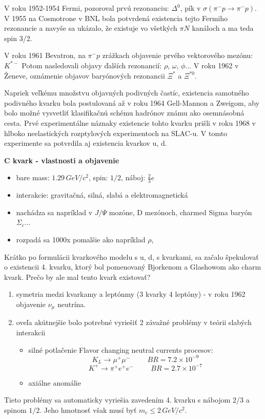 \documentclass[../../main.tex]{subfiles}
\begin{document}
V roku 1952-1954 Fermi, pozoroval prvú rezonanciu: $\Delta^0$, pík v $\sigma(\pi^{-}p \rightarrow \pi^{-}p)$. V 1955 na Cosmotrone v BNL bola potvrdená existencia tejto Fermiho rezonancie a navyše sa ukázalo, že existuje vo všetkých $\pi N$ kanáloch a ma teda spin 3/2. 

V roku 1961 Bevatron, na $\pi^{-}p$ zrážkach objavenie prvého vektorového mezónu: $K^{*-}$ Potom nasledovali objavy ďalších rezonancií: $\rho$, $\omega$, $\phi$... V roku 1962 v Ženeve, oznámenie objavov baryónových rezonancii $\Xi^{*}$ a $\Xi^{*0}$. 

Napriek veľkému množstvu objavných podivných častíc, existencia samotného podivného kvarku bola postulovaná až v roku 1964 Gell-Mannon a Zweigom, aby bolo možné vysvetliť klasifikačnú schému hadrónov známu ako osemnásobná cesta. Prvé experimentálne náznaky existencie tohto kvarku prišli v roku 1968 v hlboko neelastických rozptylových experimentoch na SLAC-u. V tomto experimente sa potvrdila aj existencia kvarkov u, d.
\newline

\textbf{C kvark - vlastnosti a objavenie}
\begin{itemize}
\item bare mass: $1.29\,\unit{GeV}/c^2$, spin: $1/2$, náboj: $\frac{2}{3}e$ 
\item interakcie: gravitačná, silná, slabá a elektromagnetická
\item nachádza sa napríklad v $J/\Psi$ mozóne, D mezónoch, charmed Sigma baryón $\Sigma_c$...
\item rozpadá sa 1000x pomalšie ako napríklad $\rho$, 
\end{itemize}

Krátko po formulácii kvarkového modelu s u, d, s kvarkami, sa začalo špekulovať o existencii 4. kvarku, ktorý bol pomenovaný Bjorkenom a Glashowom ako charm kvark. Prečo by ale mal tento kvark existovať?
\begin{enumerate}
\item symetria medzi kvarkamy a leptónmy (3 kvarky 4 leptóny) - v roku 1962 objavenie $\nu_{\mu}$ neutrína.
\item oveľa akútnejšie bolo potrebné vyriešiť 2 závažné problémy v teórii slabých interakcii
\begin{itemize}
\item silné potlačenie Flavor changing neutral currents procesov:
$$ K_L \rightarrow \mu^+ \mu^- \hspace{1cm} BR = 7.2\times 10^{-9} $$
$$ K^+ \rightarrow \pi^+ e^+ e^- \hspace{1cm} BR = 2.7\times 10^{-7} $$
\item axiálne anomálie
\end{itemize}
\end{enumerate}
Tieto problémy sa automaticky vyriešia zavedením 4. kvarku s nábojom 2/3 a spinom $ 1/2$. Jeho hmotnosť však musí byť $ m_c \leq 2\,GeV/c^2 $.
\end{document}
